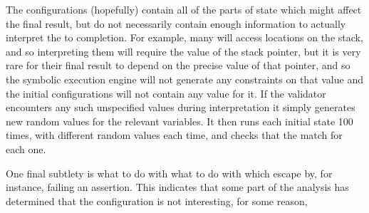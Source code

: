The configurations (hopefully) contain all of the parts of
\StateMachine state which might affect the final result, but do not
necessarily contain enough information to actually interpret the
\StateMachines to completion.  For example, many \StateMachines will
access locations on the stack, and so interpreting them will require
the value of the stack pointer, but it is very rare for their final
result to depend on the precise value of that pointer, and so the
symbolic execution engine will not generate any constraints on that
value and the initial configurations will not contain any value for
it.  If the validator encounters any such unspecified values during
\StateMachine interpretation it simply generates new random values for
the relevant variables.  It then runs each initial state 100 times,
with different random values each time, and checks that the
\StateMachines match for each one.

One final subtlety is what to do with what to do with \StateMachines
which escape by, for instance, failing an assertion.  This indicates
that some part of the analysis has determined that the configuration
is not interesting, for some reason, 


